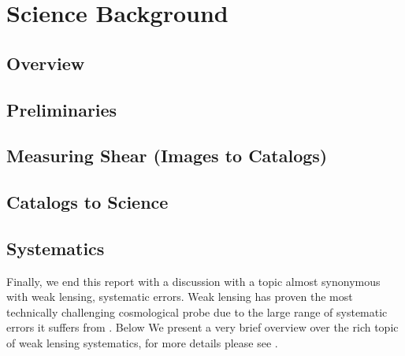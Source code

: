 \chapter{Science Background}
\section{Overview}


\section{Preliminaries}



\section{Measuring Shear (Images to Catalogs)}


\section{Catalogs to Science}


\section{Systematics}
Finally, we end this report with a discussion with a topic almost synonymous with weak lensing, systematic errors. Weak lensing has proven the most technically challenging cosmological probe due to the large range of systematic errors it suffers from \cite{general_2013}. Below We present a very brief overview over the rich topic of weak lensing systematics, for more details please see \cite{massey_2013,general_2013}.

